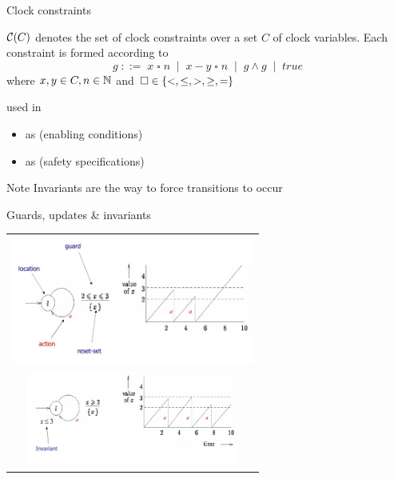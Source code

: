 \documentclass[aspectratio=169]{beamer}
\begin{document}
\begin{slide}{Clock constraints}
\small

$\mathcal{C}(C)$ denotes the  set of clock constraints over a set $C$ of clock variables.
Each constraint is formed according to 
\begin{equation*}
g \; ::=\; x \mathbin{\square} n \; \mid\; x - y \mathbin{\square} n  \; \mid\; g \land g \;\mid\; true
\end{equation*}
where $x,y \in C, n \in \mathbb{N}$ and $\square \in \mathopen{ \{ }<,\leq,>,\geq,=\mathclose{ \} }$


used in
\begin{itemize}
\item  {} as  (enabling conditions)
\item  {} as  (safety specifications)
\end{itemize}

\begin{block}{Note}
Invariants are the  way to force transitions to occur
\end{block}
\end{slide}

\begin{slide}{Guards, updates \&  invariants}
\small \centering

\begin{tabular}{c}
   \includegraphics[width=8cm]{./images/model0.jpg} \\  \includegraphics[width=7cm]{./images/model1.jpg}
\end{tabular}

\end{slide}
\end{document}
